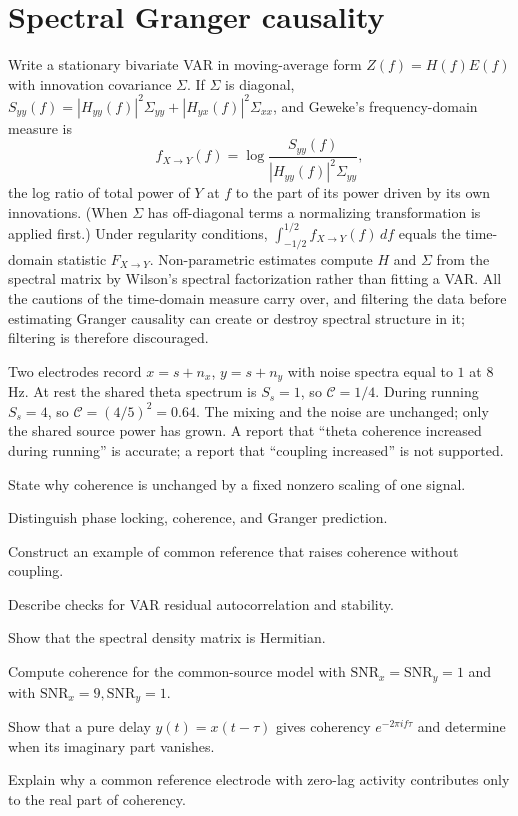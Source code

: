 \section{Spectral Granger causality}
Write a stationary bivariate VAR in moving-average form $Z(f)=H(f)E(f)$ with innovation covariance $\Sigma$. If $\Sigma$ is diagonal, $S_{yy}(f)=|H_{yy}(f)|^2\Sigma_{yy}+|H_{yx}(f)|^2\Sigma_{xx}$, and Geweke's frequency-domain measure is
\[
f_{X\to Y}(f)=\log\frac{S_{yy}(f)}{|H_{yy}(f)|^2\Sigma_{yy}},
\]
the log ratio of total power of $Y$ at $f$ to the part of its power driven by its own innovations. (When $\Sigma$ has off-diagonal terms a normalizing transformation is applied first.) Under regularity conditions, $\int_{-1/2}^{1/2}f_{X\to Y}(f)\,df$ equals the time-domain statistic $F_{X\to Y}$. Non-parametric estimates compute $H$ and $\Sigma$ from the spectral matrix by Wilson's spectral factorization rather than fitting a VAR. All the cautions of the time-domain measure carry over, and filtering the data before estimating Granger causality can create or destroy spectral structure in it; filtering is therefore discouraged.

\begin{workedexample}
Two electrodes record $x=s+n_x$, $y=s+n_y$ with noise spectra equal to $1$ at 8\,Hz. At rest the shared theta spectrum is $S_s=1$, so $\mathcal C=1/4$. During running $S_s=4$, so $\mathcal C=(4/5)^2=0.64$. The mixing and the noise are unchanged; only the shared source power has grown. A report that ``theta coherence increased during running'' is accurate; a report that ``coupling increased'' is not supported.
\end{workedexample}
\begin{exercises}
\item State why coherence is unchanged by a fixed nonzero scaling of one signal.
\item Distinguish phase locking, coherence, and Granger prediction.
\item Construct an example of common reference that raises coherence without coupling.
\item Describe checks for VAR residual autocorrelation and stability.
\item Show that the spectral density matrix is Hermitian.
\item Compute coherence for the common-source model with $\mathrm{SNR}_x=\mathrm{SNR}_y=1$ and with $\mathrm{SNR}_x=9,\mathrm{SNR}_y=1$.
\item Show that a pure delay $y(t)=x(t-\tau)$ gives coherency $e^{-2\pi if\tau}$ and determine when its imaginary part vanishes.
\item Explain why a common reference electrode with zero-lag activity contributes only to the real part of coherency.
\end{exercises}
